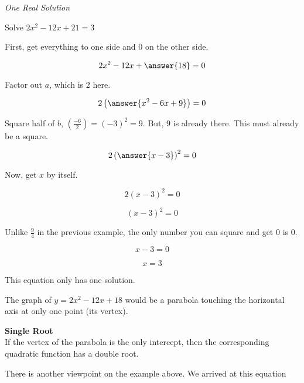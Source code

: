 \documentclass{ximera}
\begin{document}
\begin{example} \textit{One Real Solution}

Solve $2 x^2 - 12x + 21 = 3$ \\

\begin{explanation}


First, get everything to one side and $0$ on the other side.



\[  2 x^2 - 12x + \answer{18} = 0  \]

Factor out $a$, which is $2$ here.

\[  2 \left( \answer{x^2 - 6x + 9} \right) = 0  \]


Square half of $b$, $\left(\frac{-6}{2}\right) = (-3)^2 = 9$.  But, $9$ is already there.  This must already be a square.



\[  2 \left( \answer{x - 3} \right)^2 = 0  \]


Now, get $x$ by itself.

\[  2 (x - 3)^2 = 0  \]

\[  (x - 3)^2 = 0  \]


Unlike $\frac{9}{4}$ in the previous example, the only number you can square and get $0$ is $0$.

\[  x - 3 = 0  \]

\[  x = 3  \]


This equation only has one solution.


\end{explanation}
\end{example}



The graph of $y = 2 x^2 - 12x + 18$ would be a parabola touching the horizontal axis at only one point (its vertex).




\begin{idea} \textbf{\textcolor{red!80!black}{Single Root}} \\

If the vertex of the parabola is the only intercept, then the corresponding quadratic function has a double root.


\end{idea}



There is another viewpoint on the example above.  We arrived at this equation
\end{document}

